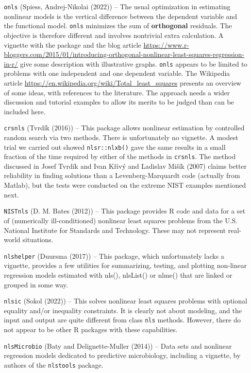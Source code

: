 \texttt{onls} (Spiess, Andrej-Nikolai (2022)) -- The usual optimization in estimating nonlinear models
is the vertical difference between the dependent variable and the functional
model. \texttt{onls} minimizes the sum of \textbf{orthogonal} residuals. The objective is
therefore different and involves nontrivial extra calculation. A vignette with
the package and the blog article
\url{https://www.r-bloggers.com/2015/01/introducing-orthogonal-nonlinear-least-squares-regression-in-r/}
give some description with illustrative graphs. \texttt{onls} appears to be limited to
problems with one independent and one dependent variable. The Wikipedia article
\url{https://en.wikipedia.org/wiki/Total_least_squares} presents an overview of some
ideas, with references to the literature. The approach needs a wider
discussion and tutorial examples to allow its merits to be judged than can be
included here.

\texttt{crsnls} (Tvrdík (2016)) -- This package allows nonlinear estimation by
controlled random search via two methods. There is unfortunately no vignette.
A modest trial we carried out showed \texttt{nlsr::nlxb()} gave the same results in
a small fraction of the time required by either of the methods in \texttt{crsnls}. The
method discussed in Josef Tvrdík and Ivan Křivý and Ladislav Mišík (2007) claims better reliability in finding solutions
than a Levenberg-Marquardt code (actually from Matlab), but the tests were conducted
on the extreme NIST examples mentioned next.

\texttt{NISTnls} (D. M. Bates (2012)) -- This package provides R code and data for a set of
(numerically ill-conditioned) nonlinear least squares problems from the U.S. National
Institute for Standards and Technology. These may not represent real-world situations.

\texttt{nlshelper} (Duursma (2017)) -- This package, which unfortunately lacks a
vignette, provides a few utilities for summarizing, testing, and plotting
non-linear regression models estimated with nls(), nlsList() or nlme() that
are linked or grouped in some way.

\texttt{nlsic} (Sokol (2022)) -- This solves nonlinear least squares problems with optional
equality and/or inequality constraints. It is clearly not about modeling, and
the input and output are quite different from class \texttt{nls} methods. However, there do
not appear to be other R packages with these capabilities.

\texttt{nlsMicrobio} (Baty and Delignette-Muller (2014)) -- Data sets and nonlinear regression models
dedicated to predictive microbiology, including a vignette, by authors of the
\texttt{nlstools} package.

